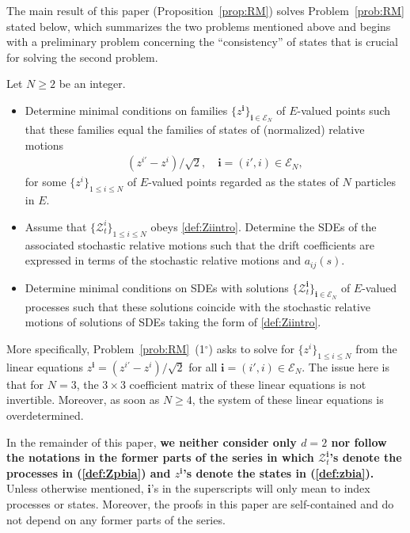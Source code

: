 \documentclass[12pt, twoside]{article}
\numberwithin{figure}{section}
\newcommand{\1}{\mathds 1}
\newcommand{\mc}{\mathcal}
\newcommand{\2}{{\mathbf 1}}
\newcommand{\cc}{{^\circ}}
\newcommand{\bi}{\mathbf i}
\newcommand{\two}{{\sqrt{2}}}
\begin{document}
The main result of this paper (Proposition~\ref{prop:RM}) solves 
Problem~\ref{prob:RM} stated below, which summarizes the two problems mentioned above and begins with a preliminary problem concerning the ``consistency'' of states that is crucial for solving the second problem.

\begin{problem}\label{prob:RM}
Let $N\geq 2$ be an integer.
\begin{itemize}
\item [\rm (1$\cc$)] Determine minimal conditions on families $\{z^\bi\}_{\bi\in \mc E_N}$ of $E$-valued points such that these families equal the families of states of (normalized) relative motions
\begin{align}\label{def:zbia}
(z^{i\prime}-z^i)/\two, \quad \bi=(i\prime,i)\in \mc E_N,
\end{align}
for some $\{z^i\}_{1\leq i\leq N}$ of $E$-valued points regarded as the states of $N$ particles in $E$.

 
\item [\rm (2$\cc$)] Assume that $\{\mathcal Z^i_t\}_{1\leq i\leq N}$ obeys \eqref{def:Ziintro}. Determine the SDEs of the associated stochastic relative motions such that the drift coefficients are expressed in terms of the stochastic relative motions and $a_{ij}(s)$.  
\item [\rm (3$\cc$)] Determine minimal conditions on SDEs with solutions $\{\mathcal Z_t^\bi\}_{\bi\in \mc E_N}$ of $E$-valued processes such that these solutions coincide with the stochastic relative motions of solutions of SDEs taking the form of \eqref{def:Ziintro}. 
\end{itemize}
\end{problem}

More specifically, Problem~\ref{prob:RM}~(1$\cc$) asks to solve for $\{z^i\}_{1\leq i\leq N}$ from the linear equations $z^\bi=(z^{i\prime}-z^i)/\two$ for all $\bi=(i\prime,i)\in \mc E_N$. The issue here is that for $N=3$, the $3\times 3$ coefficient matrix of these linear equations is not invertible. Moreover, as soon as $N\geq 4$, the system of these linear equations is overdetermined. 

In the remainder of this paper, {\bf we neither consider only $d=2$ nor follow the notations in the former parts \cite{C:SDBG1-4,C:SDBG2-4,C:SDBG3-4} of the series in which $\mathcal Z^\bi_t$'s denote the processes in (\ref{def:Zpbia}) and $z^\bi$'s denote the states in (\ref{def:zbia}).}  Unless otherwise mentioned, $\bi$'s in the superscripts will only mean to index processes or states. Moreover, the proofs in this paper are self-contained and do not depend on any former parts of the series. \vspace{-.4cm}
\end{document}
